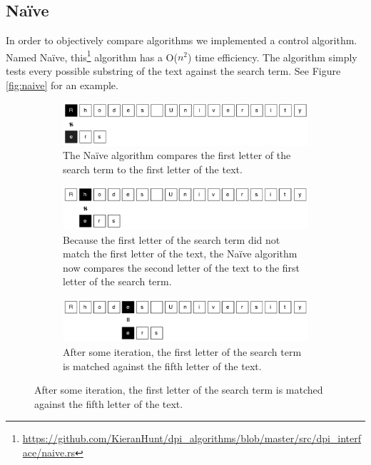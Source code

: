 \documentclass{article}
\begin{document}
\subsection{Na{\"i}ve} \label{sec:naive} \label{sec:naive}
In order to objectively compare algorithms we implemented a control algorithm. Named Na{\"i}ve, this\footnote{\url{https://github.com/KieranHunt/dpi_algorithms/blob/master/src/dpi_interface/naive.rs}} algorithm has a O(\(n^2\)) time efficiency. The algorithm simply tests every possible substring of the text against the search term. See Figure \ref{fig:naive} for an example.
\begin{figure}[h!bt]
  
  \centering
  
  \begin{subfigure}{\textwidth}
  \makeatletter
  \includegraphics[width=\textwidth]{images/naive-1}
  \caption{The Na{\"i}ve algorithm compares the first letter of the search term to the first letter of the text.}
  \end{subfigure}
  
  \begin{subfigure}{\textwidth}
  \makeatletter
  \includegraphics[width=\textwidth]{images/naive-2}
  \caption{Because the first letter of the search term did not match the first letter of the text, the Na{\"i}ve algorithm now compares the second letter of the text to the first letter of the search term.}
  \end{subfigure}
  
  \begin{subfigure}{\textwidth}
  \makeatletter
  \includegraphics[width=\textwidth]{images/naive-3}
  \caption{After some iteration, the first letter of the search term is matched against the fifth letter of the text.}
  \end{subfigure}
  

\end{figure}
\end{document}
